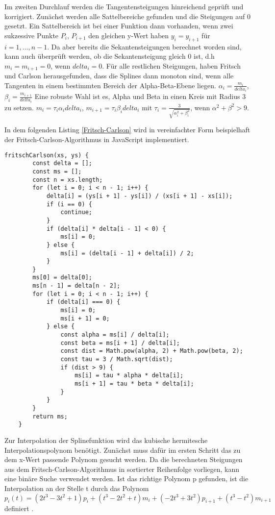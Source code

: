 Im zweiten Durchlauf werden die Tangentensteigungen hinreichend geprüft und korrigiert. Zunächst werden alle Sattelbereiche gefunden und die Steigungen auf $0$ gesetzt. Ein Sattelbereich ist bei einer Funktion dann vorhanden, wenn zwei sukzessive Punkte $P_i$, $P_{i+1}$ den gleichen y-Wert haben $y_i=y_{i+1}$ für $i=1,\dots,n-1$. Da aber bereits die Sekantensteigungen berechnet worden sind, kann auch überprüft werden, ob die Sekantensteigung gleich $0$ ist, d.h
$m_i=m_{i+1}=0$, wenn $delta_i=0$. Für alle restlichen Steigungen, haben
Fritsch und Carlson herausgefunden, dass die Splines dann monoton sind, wenn alle Tangenten in einem bestimmten Bereich der Alpha-Beta-Ebene liegen. 
$\alpha_i =\frac{m_i}{delta_i}$, $\beta_i =\frac{m_{i+1}}{delta_i}$
Eine robuste Wahl ist es, Alpha und Beta in einen Kreis mit Radius 3 zu setzen.
$m_i=\tau_i\alpha_i delta_i$, $m_{i+1}=\tau_i\beta_i delta_i$ mit $\tau_i=\frac{3}{\sqrt{\alpha_i^2+\beta_i^2}}$, wenn $\alpha^2+\beta^2>9$. \cite{Fritschcarlson:1980}

In dem folgenden Listing \ref{Fritsch-Carlson} wird in vereinfachter Form beispielhaft der Fritsch-Carlson-Algorithmus in JavaScript implementiert.
\begin{lstlisting}[caption=Fritsch-Carlson Methode,label=Fritsch-Carlson]
    fritschCarlson(xs, ys) {
        const delta = [];
        const ms = [];
        const n = xs.length;
        for (let i = 0; i < n - 1; i++) {
            delta[i] = (ys[i + 1] - ys[i]) / (xs[i + 1] - xs[i]);
            if (i == 0) {
                continue;
            }
            if (delta[i] * delta[i - 1] < 0) {
                ms[i] = 0;
            } else {
                ms[i] = (delta[i - 1] + delta[i]) / 2;
            }
        }
        ms[0] = delta[0];
        ms[n - 1] = delta[n - 2];
        for (let i = 0; i < n - 1; i++) {
            if (delta[i] === 0) {
                ms[i] = 0;
                ms[i + 1] = 0;
            } else {
                const alpha = ms[i] / delta[i];
                const beta = ms[i + 1] / delta[i];
                const dist = Math.pow(alpha, 2) + Math.pow(beta, 2);
                const tau = 3 / Math.sqrt(dist);
                if (dist > 9) {
                    ms[i] = tau * alpha * delta[i];
                    ms[i + 1] = tau * beta * delta[i];
                }
            }
        }
        return ms;
    }
\end{lstlisting}

Zur Interpolation der Splinefunktion wird das kubische hermitesche Interpolationspolynom benötigt. Zunächst muss dafür im ersten Schritt das zu dem x-Wert passende Polynom gesucht werden. Da die berechneten Steigungen aus dem Fritsch-Carlson-Algorithmus in sortierter Reihenfolge vorliegen, kann eine binäre Suche verwendet werden.
Ist das richtige Polynom p gefunden, ist die Interpolation an der Stelle t durch das Polynom
$$p_i(t)=(2t^3-3t^2+1)p_i+(t^3-2t^2+t)m_i+(-2t^3+3t^2)p_{i+1}+(t^3-t^2)m_{i+1}$$
definiert \cite{Pat:2009}.

